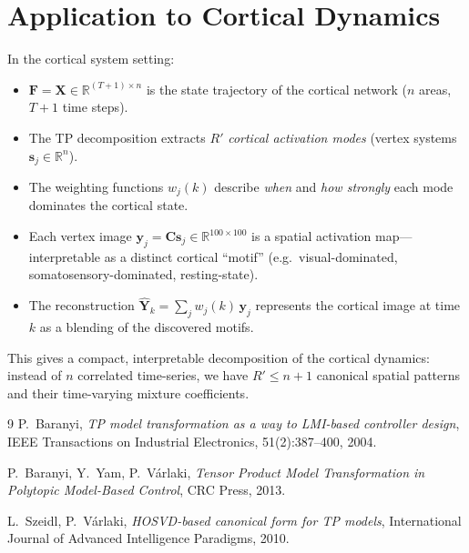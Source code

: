 \documentclass[11pt]{article}
\theoremstyle{definition}
\theoremstyle{plain}
\newcommand{\R}{\mathbb{R}}
\newcommand{\mat}[1]{\mathbf{#1}}
\begin{document}
\section{Application to Cortical Dynamics}

In the cortical system setting:

\begin{itemize}
  \item $\mat{F} = \mat{X} \in \R^{(T+1)\times n}$ is the state trajectory
        of the cortical network ($n$ areas, $T+1$ time steps).

  \item The TP decomposition extracts $R'$ \emph{cortical activation modes}
        (vertex systems $\mat{s}_j \in \R^n$).

  \item The weighting functions $w_j(k)$ describe \emph{when} and \emph{how
        strongly} each mode dominates the cortical state.

  \item Each vertex image $\mat{y}_j = \mat{C}\mat{s}_j \in \R^{100 \times 100}$
        is a spatial activation map---interpretable as a distinct
        cortical ``motif'' (e.g.\ visual-dominated, somatosensory-dominated,
        resting-state).

  \item The reconstruction $\hat{\mat{Y}}_k = \sum_j w_j(k)\,\mat{y}_j$
        represents the cortical image at time $k$ as a blending of
        the discovered motifs.
\end{itemize}

This gives a compact, interpretable decomposition of the cortical
dynamics: instead of $n$ correlated time-series, we have $R' \le n+1$
canonical spatial patterns and their time-varying mixture coefficients.

\bigskip

\begin{thebibliography}{9}
  P.\ Baranyi,
  \textit{TP model transformation as a way to LMI-based controller design},
  IEEE Transactions on Industrial Electronics, 51(2):387--400, 2004.

  P.\ Baranyi, Y.\ Yam, P.\ V\'{a}rlaki,
  \textit{Tensor Product Model Transformation in Polytopic Model-Based
  Control},
  CRC Press, 2013.

  L.\ Szeidl, P.\ V\'{a}rlaki,
  \textit{HOSVD-based canonical form for TP models},
  International Journal of Advanced Intelligence Paradigms, 2010.
\end{thebibliography}
\end{document}
